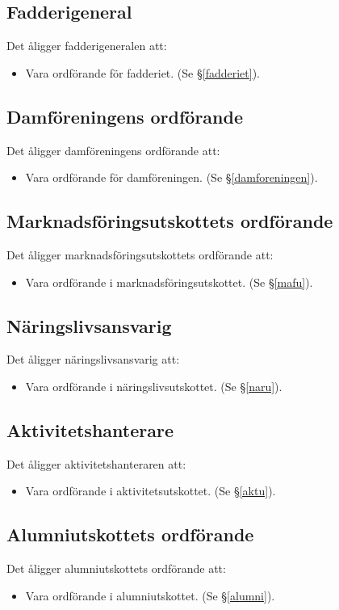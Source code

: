 \documentclass{datateknologsektionen-document}
\begin{document}
\subsection{Fadderigeneral}
Det åligger fadderigeneralen att:
\begin{itemize}
  \item Vara ordförande för fadderiet. (Se \S \ref{fadderiet}).
\end{itemize}
\subsection{Damföreningens ordförande}
Det åligger damföreningens ordförande att:
\begin{itemize}
  \item Vara ordförande för damföreningen. (Se \S \ref{damforeningen}).
\end{itemize}
\subsection{Marknadsföringsutskottets ordförande}
Det åligger marknadsföringsutskottets ordförande att:
\begin{itemize}
  \item Vara ordförande i marknadsföringsutskottet. (Se \S \ref{mafu}).
\end{itemize}
\subsection{Näringslivsansvarig}
Det åligger näringslivsansvarig att:
\begin{itemize}
  \item Vara ordförande i näringslivsutskottet. (Se \S \ref{naru}).
\end{itemize}
\subsection{Aktivitetshanterare}
Det åligger aktivitetshanteraren att:
\begin{itemize}
  \item Vara ordförande i aktivitetsutskottet. (Se \S \ref{aktu}).
\end{itemize}

\subsection{Alumniutskottets ordförande}
Det åligger alumniutskottets ordförande att:
\begin{itemize}
  \item Vara ordförande i alumniutskottet. (Se \S \ref{alumni}).
\end{itemize}
\end{document}
